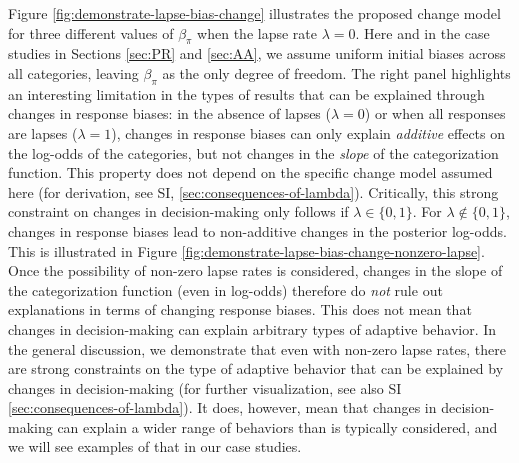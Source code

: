 \documentclass[
  11pt,
  english,
  man,floatsintext]{apa6}
\begin{document}
Figure \ref{fig:demonstrate-lapse-bias-change} illustrates the proposed change model for three different values of \(\beta_{\pi}\) when the lapse rate \(\lambda=0\). Here and in the case studies in Sections \ref{sec:PR} and \ref{sec:AA}, we assume uniform initial biases across all categories, leaving \(\beta_{\pi}\) as the only degree of freedom. The right panel highlights an interesting limitation in the types of results that can be explained through changes in response biases: in the absence of lapses (\(\lambda=0\)) or when all responses are lapses (\(\lambda=1\)), changes in response biases can only explain \emph{additive} effects on the log-odds of the categories, but not changes in the \emph{slope} of the categorization function. This property does not depend on the specific change model assumed here (for derivation, see SI, \ref{sec:consequences-of-lambda}). Critically, this strong constraint on changes in decision-making only follows if \(\lambda \in \{0,1\}\). For \(\lambda \not\in \{0,1\}\), changes in response biases lead to non-additive changes in the posterior log-odds. This is illustrated in Figure \ref{fig:demonstrate-lapse-bias-change-nonzero-lapse}. Once the possibility of non-zero lapse rates is considered, changes in the slope of the categorization function (even in log-odds) therefore do \emph{not} rule out explanations in terms of changing response biases. This does not mean that changes in decision-making can explain arbitrary types of adaptive behavior. In the general discussion, we demonstrate that even with non-zero lapse rates, there are strong constraints on the type of adaptive behavior that can be explained by changes in decision-making (for further visualization, see also SI \ref{sec:consequences-of-lambda}). It does, however, mean that changes in decision-making can explain a wider range of behaviors than is typically considered, and we will see examples of that in our case studies.
\end{document}
